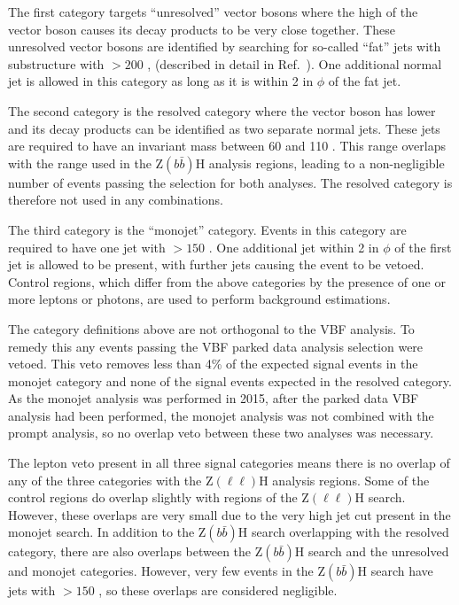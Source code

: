 The first category targets ``unresolved'' vector bosons where the high \pt of the vector boson causes its decay products to be very close together. These unresolved vector bosons are identified by searching for so-called ``fat'' jets with substructure with \pt$>200$ \GeV, (described in detail in Ref.~\cite{CMS-PAS-EXO-12-055}). One additional normal jet is allowed in this category as long as it is within 2 in $\phi$ of the fat jet.

The second category is the resolved category where the vector boson has lower \pt and its decay products can be identified as two separate normal jets. These jets are required to have an invariant mass between 60 and 110 \GeV. This range overlaps with the range used in the Z$(b\bar{b})$H analysis regions, leading to a non-negligible number of events passing the selection for both analyses. The resolved category is therefore not used in any combinations.

The third category is the ``monojet'' category. Events in this category are required to have one jet with \pt$>150$ \GeV. One additional jet within 2 in $\phi$ of the first jet is allowed to be present, with further jets causing the event to be vetoed. Control regions, which differ from the above categories by the presence of one or more leptons or photons, are used to perform background estimations.

The category definitions above are not orthogonal to the \ac{VBF} analysis. To remedy this any events passing the \ac{VBF} parked data analysis selection were vetoed. This veto removes less than 4\% of the expected signal events in the monojet category and none of the signal events expected in the resolved category. As the monojet analysis was performed in 2015, after the parked data \ac{VBF} analysis had been performed, the monojet analysis was not combined with the prompt analysis, so no overlap veto between these two analyses was necessary.

The lepton veto present in all three signal categories means there is no overlap of any of the three categories with the Z$(\ell\ell)$H analysis regions. Some of the control regions do overlap slightly with regions of the Z$(\ell\ell)$H search. However, these overlaps are very small due to the very high jet \pt cut present in the monojet search. In addition to the Z$(b\bar{b})$H search overlapping with the resolved category, there are also overlaps between the Z$(b\bar{b})$H search and the  unresolved and monojet categories. However, very few events in the Z$(b\bar{b})$H search have jets with \pt$>150$ \GeV, so these overlaps are considered negligible.

